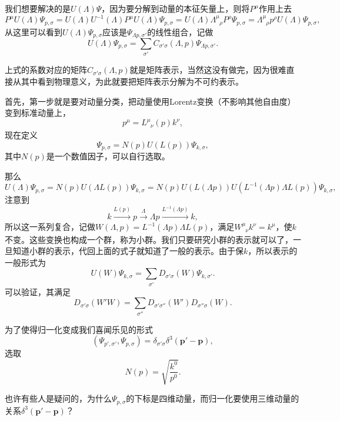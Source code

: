 \documentclass[9pt]{extbook}
\begin{document}
我们想要解决的是$U(\Lambda)\Psi$，因为要分解到动量的本征矢量上，则将$P^\mu$作用上去
\[
P^\mu U(\Lambda)\Psi_{p,\sigma}=U(\Lambda)U^{-1}(\Lambda)P^\mu U(\Lambda)\Psi_{p,\sigma}=U(\Lambda)\Lambda^\mu_{\phantom{\mu}\rho}P^\rho\Psi_{p,\sigma}=\Lambda^\mu_{\phantom{\mu}\rho}p^\rho U(\Lambda)\Psi_{p,\sigma},
\]
从这里可以看到$U(\Lambda)\Psi_{p,\sigma}$应该是$\Psi_{\Lambda p,\sigma'}$的线性组合，记做
\[
U(\Lambda)\Psi_{p,\sigma}=\sum_{\sigma'}C_{\sigma'\sigma}(\Lambda,p)\Psi_{\Lambda p,\sigma'}.
\]

上式的系数对应的矩阵$C_{\sigma'\sigma}(\Lambda,p)$就是矩阵表示，当然这没有做完，因为很难直接从其中看到物理意义，为此就要把矩阵表示分解为不可约表示。

首先，第一步就是要对动量分类，把动量使用Lorentz变换（不影响其他自由度）变到标准动量上，
\[
p^\mu=L^\mu_{\phantom{\mu}\nu}(p)k^\nu,
\]
现在定义
\[
\Psi_{p,\sigma}=N(p)U(L(p))\Psi_{k,\sigma},
\]
其中$N(p)$是一个数值因子，可以自行选取。

那么
\[
U(\Lambda)\Psi_{p,\sigma}=N(p)U(\Lambda L(p))\Psi_{k,\sigma}=N(p)U(L(\Lambda p))U(L^{-1}(\Lambda p)\Lambda L(p))\Psi_{k,\sigma},
\]
注意到
\[
k\xrightarrow{L(p)}p\xrightarrow{\Lambda}\Lambda p \xrightarrow{L^{-1}(\Lambda p)}k,
\]
所以这一系列复合，记做$W(\Lambda,p)=L^{-1}(\Lambda p)\Lambda L(p)$，满足$W^\mu_{\phantom{\mu}\nu}k^\nu=k^\mu$，使$k$不变。这些变换也构成一个群，称为小群。我们只要研究小群的表示就可以了，一旦知道小群的表示，代回上面的式子就知道了一般的表示。由于保$k$，所以表示的一般形式为
\[
U(W)\Psi_{k,\sigma}=\sum_{\sigma'}D_{\sigma'\sigma}(W)\Psi_{k,\sigma'}.
\]
可以验证，其满足
\[
D_{\sigma'\sigma}(W'W)=\sum_{\sigma''}D_{\sigma'\sigma''}(W')D_{\sigma''\sigma}(W).
\]

为了使得归一化变成我们喜闻乐见的形式
\[
(\Psi_{p',\sigma'},\Psi_{p,\sigma})=\delta_{\sigma'\sigma}\delta^3(\bm{p}'-\bm{p}),
\]
选取
\[
N(p)=\sqrt{\frac{k^0}{p^0}}.
\]

也许有些人是疑问的，为什么$\Psi_{p,\sigma}$的下标是四维动量，而归一化要使用三维动量的关系$\delta^3(\bm{p}'-\bm{p})$？

\end{document}
